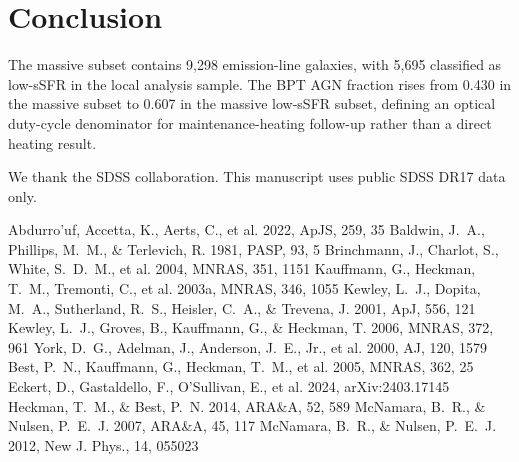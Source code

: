 \documentclass[twocolumn]{aastex631}
\begin{document}
\section{Conclusion}\label{sec:conclusion}
The massive subset contains 9,298 emission-line galaxies, with 5,695 classified as low-sSFR in the local analysis sample. The BPT AGN fraction rises from 0.430 in the massive subset to 0.607 in the massive low-sSFR subset, defining an optical duty-cycle denominator for maintenance-heating follow-up rather than a direct heating result.

\acknowledgments
We thank the SDSS collaboration. This manuscript uses public SDSS DR17 data only.


\begin{thebibliography}{}
 Abdurro'uf, Accetta, K., Aerts, C., et al. 2022, ApJS, 259, 35
 Baldwin, J.~A., Phillips, M.~M., \& Terlevich, R. 1981, PASP, 93, 5
 Brinchmann, J., Charlot, S., White, S.~D.~M., et al. 2004, MNRAS, 351, 1151
 Kauffmann, G., Heckman, T.~M., Tremonti, C., et al. 2003a, MNRAS, 346, 1055
 Kewley, L.~J., Dopita, M.~A., Sutherland, R.~S., Heisler, C.~A., \& Trevena, J. 2001, ApJ, 556, 121
 Kewley, L.~J., Groves, B., Kauffmann, G., \& Heckman, T. 2006, MNRAS, 372, 961
 York, D.~G., Adelman, J., Anderson, J.~E., Jr., et al. 2000, AJ, 120, 1579
 Best, P.~N., Kauffmann, G., Heckman, T.~M., et al. 2005, MNRAS, 362, 25
 Eckert, D., Gastaldello, F., O'Sullivan, E., et al. 2024, arXiv:2403.17145
 Heckman, T.~M., \& Best, P.~N. 2014, ARA\&A, 52, 589
 McNamara, B.~R., \& Nulsen, P.~E.~J. 2007, ARA\&A, 45, 117
 McNamara, B.~R., \& Nulsen, P.~E.~J. 2012, New J. Phys., 14, 055023
\end{thebibliography}
\end{document}
